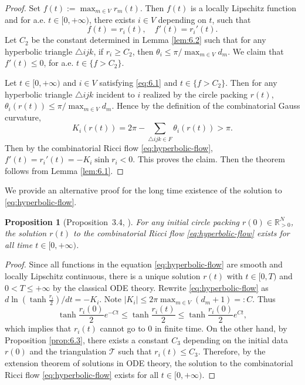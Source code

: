 \documentclass[12pt]{amsart}
\numberwithin{equation}{section}
\newtheorem{prop}{Proposition}[section]
\begin{document}
\begin{proof}
Set $f(t) := \max_{m \in V} r_m(t)$. Then $f(t)$ is a locally Lipschitz function and for a.e. $t \in [0,+\infty)$,
there exists $i \in V$ depending on $t$, such that
\begin{equation}\label{eq:6.1}
f(t) = r_i(t), \quad f'(t) = r_i'(t).
\end{equation}
Let $C_2$ be the constant determined in Lemma \ref{lem:6.2} such that for any hyperbolic triangle $\triangle ijk$, if $r_i \geq C_2$,
then $\theta_i \leq \pi / \max_{m \in V} d_m$. We claim that $f'(t) \leq 0$, for a.e. $t \in \{f > C_2\}$.

Let $t \in [0,+\infty)$ and $i \in V$ satisfying \eqref{eq:6.1} and $t \in \{f > C_2\}$. Then for any hyperbolic triangle $\triangle ijk$
incident to $i$ realized by the circle packing $r(t)$, $\theta_i(r(t)) \leq \pi / \max_{m \in V} d_m$. Hence by the definition of the
combinatorial Gauss curvature,
\[
K_i(r(t)) = 2\pi - \sum_{\triangle ijk \in F} \theta_i(r(t)) > \pi.
\]
Then by the combinatorial Ricci flow \eqref{eq:hyperbolic-flow}, $f'(t) = r_i'(t) = -K_i \sinh r_i < 0$. This proves the claim.
Then the theorem follows from Lemma \ref{lem:6.1}.
\end{proof}

We provide an alternative proof for the long time existence of the solution to \eqref{eq:hyperbolic-flow}.

\begin{prop}[Proposition~3.4, \cite{ChowLuo}]\label{prop:6.4}
For any initial circle packing $r(0) \in \mathbb{R}^N_{>0}$, the solution $r(t)$ to
the combinatorial Ricci flow \eqref{eq:hyperbolic-flow} exists for all time $t \in [0,+\infty)$.
\end{prop}

\begin{proof}
Since all functions in the equation \eqref{eq:hyperbolic-flow} are smooth and locally Lipschitz continuous, there is
a unique solution $r(t)$ with $t \in [0, T)$ and $0 < T \leq +\infty$ by the classical ODE theory. Rewrite \eqref{eq:hyperbolic-flow} as
$d \ln(\tanh \frac{r_i}{2}) / dt = -K_i$. Note $|K_i| \leq 2\pi \max_{m \in V}(d_m + 1) =: C$. Thus
\[
\tanh\frac{r_i(0)}{2} e^{-Ct} \leq \tanh\frac{r_i(t)}{2} \leq \tanh\frac{r_i(0)}{2} e^{Ct},
\]
which implies that $r_i(t)$ cannot go to $0$ in finite time. On the other hand, by Proposition \ref{prop:6.3}, there exists
a constant $C_3$ depending on the initial data $r(0)$ and the triangulation $\mathcal{T}$ such that $r_i(t) \leq C_3$. Therefore,
by the extension theorem of solutions in ODE theory, the solution to the combinatorial Ricci flow \eqref{eq:hyperbolic-flow}
exists for all $t \in [0,+\infty)$.
\end{proof}
\end{document}
